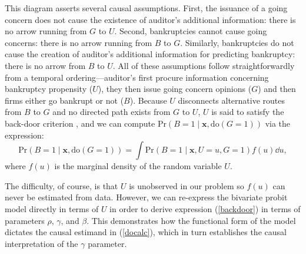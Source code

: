 \documentclass[aoas,preprint, 11pt, dvipsnames, table, x11name]{imsart}
\theoremstyle{remark}
\begin{document}
	This diagram asserts several causal assumptions.  First, the issuance of a going concern does not cause the existence of auditor's additional information:  there is no arrow running from $G$ to $U$.  Second, bankruptcies cannot cause going concerns:  there is no arrow running from $B$ to $G$.  Similarly, bankruptcies do not cause the creation of auditor's additional information for predicting bankruptcy:  there is no arrow from $B$ to $U$.  All of these assumptions follow straightforwardly from a temporal ordering---auditor's first procure information concerning bankruptcy propensity ($U$), they then issue going concern opinions ($G$) and then firms either go bankrupt or not ($B$).  Because $U$ disconnects alternative routes from $B$ to $G$ and no directed path exists from $G$ to $U$, $U$ is said to satisfy the back-door criterion \cite{pearl-2000}, and we can compute $\mbox{Pr}(B = 1 \mid \mathbf{x}, \text{do}(G = 1))$ via the expression:
	\begin{equation}\label{backdoor}
		\mbox{Pr}(B = 1 \mid \mathbf{x}, \text{do}(G = 1)) =  \int  \mbox{Pr}(B = 1 \mid \mathbf{x}, U=u, G = 1) f(u) \dd u,
	\end{equation}
	where $f(u)$ is the marginal density of the random variable $U$.
	
	The difficulty, of course, is that $U$ is unobserved in our problem so $f(u)$ can never be estimated from data.  However, we can re-express the bivariate probit model directly in terms of $U$ in order to derive expression (\ref{backdoor}) in terms of parameters $\rho$, $\gamma$, and $\beta$.  This demonstrates how the functional form of the model dictates the causal estimand in (\ref{docalc}), which in turn establishes the causal interpretation of the $\gamma$ parameter.  
	
\end{document}
